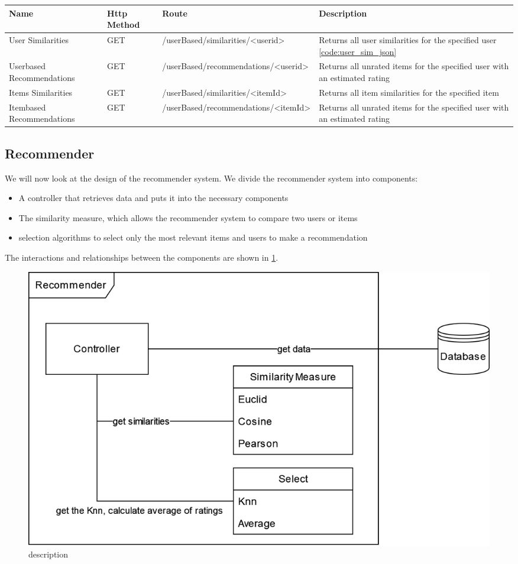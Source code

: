 \begin{longtable}{|p{2.5cm}|p{2.5cm}|p{3.2cm}|p{5cm}|}
    \hline
	  Name & Http Method & Route & Description \\
    \hline
    \hline
    User Similarities & GET & /userBased/\allowbreak similarities/\allowbreak<userid> & Returns all user similarities for the specified user \ref{code:user_sim_json}\\
    \hline
    Userbased Recommendations & GET & /userBased/\allowbreak recommendations/\allowbreak<userid> & Returns all unrated items for the specified user with an estimated rating\\
    \hline
    Items Similarities & GET & /userBased/\allowbreak similarities/\allowbreak<itemId> & Returns all item similarities for the specified item\\
    \hline
    Itembased Recommendations & GET & /userBased/\allowbreak recommendations/\allowbreak <itemId> & Returns all unrated items for the specified user with an estimated rating\\
    \hline
\end{longtable}

\subsection{Recommender}

We will now look at the design of the recommender system. We divide the recommender system into components: 

\begin{itemize}
    \item A controller that retrieves data and puts it into the necessary components
    \item The similarity measure, which allows the recommender system to compare two users or items
    \item selection algorithms to select only the most relevant items and users to make a recommendation
\end{itemize}

The interactions and relationships between the components are shown in \ref{fig:recommender_design}.
\newpage

\begin{figure}[h]
\centering
\includegraphics[width=\textwidth]{images/BPM_recommender_design}
\caption{\label{fig:recommender_design}description}
\end{figure}


